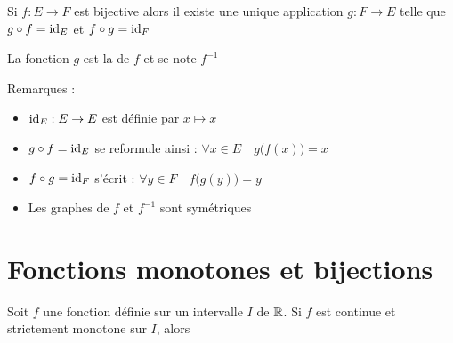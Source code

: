 \begin{frame}


\begin{proposition}
Si $f :  E \to F$ est bijective alors il existe une 
unique application $g : F \to E$ telle que $g\circ f = \mathop{\text{id}}\nolimits_E$ et $f\circ g = \mathop{\text{id}}\nolimits_F$
\end{proposition}

La fonction $g$ est la  de $f$ et se note $f^{-1}$

\bigskip
\pause

Remarques :
\begin{itemize}
  \item $\mathop{\text{id}}\nolimits_E : E \to E$ est définie par $x \mapsto x$
\pause  
  \item $g \circ f = \mathop{\text{id}}\nolimits_E$ se reformule ainsi : $\forall x \in E\quad  g\big(f(x)\big) = x$
\pause  
  \item $f \circ g = \mathop{\text{id}}\nolimits_F$  s'écrit : $\forall y \in F\quad  f\big(g(y)\big) = y$
\pause  
  \item Les graphes de $f$ et $f^{-1}$ sont symétriques 
\end{itemize}

\vspace*{-4ex}\hfill
\begin{minipage}{0.39\textwidth}
\end{minipage}






  
\end{frame}


\section{Fonctions monotones et bijections}

\begin{frame}

\begin{theoreme}[de la bijection]
Soit $f$ une fonction définie sur un intervalle $I$ de $\mathbb{R}$. Si $f$ est continue 
et strictement monotone sur $I$, alors

\begin{enumerate}

\end{enumerate}
\end{theoreme}



  
\end{frame}



